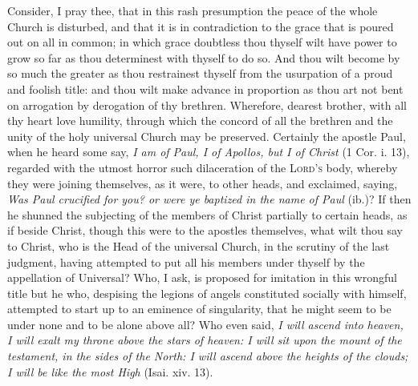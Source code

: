 Consider, I pray thee, that in this rash presumption the peace of the whole Church is disturbed, and that it is in contradiction to the grace that is poured out on all in common; in which grace doubtless thou thyself wilt have power to grow so far as thou determinest with thyself to do so. And thou wilt become by so much the greater as thou restrainest thyself from the usurpation of a proud and foolish title: and thou wilt make advance in proportion as thou art not bent on arrogation by derogation of thy brethren. Wherefore, dearest brother, with all thy heart love humility, through which the concord of all the brethren and the unity of the holy universal Church may be preserved. Certainly the apostle Paul, when he heard some say, \emph{I am of Paul, I of Apollos, but I of Christ} (1 Cor. i. 13), regarded with the utmost horror such dilaceration of the \textsc{Lord’s} body, whereby they were joining themselves, as it were, to other heads, and exclaimed, saying, \emph{Was Paul crucified for you? or were ye baptized in the name of Paul} (ib.)? If then he shunned the subjecting of the members of Christ partially to certain heads, as if beside Christ, though this were to the apostles themselves, what wilt thou say to Christ, who is the Head of the universal Church, in the scrutiny of the last judgment, having attempted to put all his members under thyself by the appellation of Universal? Who, I ask, is proposed for imitation in this wrongful title but he who, despising the legions of angels constituted socially with himself, attempted to start up to an eminence of singularity, that he might seem to be under none and to be alone above all? Who even said, \emph{I will ascend into heaven, I will exalt my throne above the stars of heaven: I will sit upon the mount of the testament, in the sides of the North: I will ascend above the heights of the clouds; I will be like the most High} (Isai. xiv. 13).


